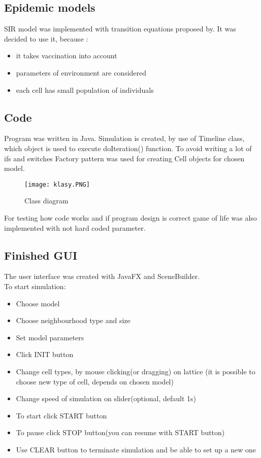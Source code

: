 \documentclass[a4paper, 11pt]{article}
\begin{document}
\subsection{Epidemic models}

SIR model was implemented with transition equations proposed by\cite{WHITE}. It was decided to use it, because :\\
\begin{itemize}
\item it takes vaccination into account
\item parameters of environment are considered
\item each cell has small population of individuals
\end{itemize}



\subsection{Code}
Program was written in Java. Simulation is created, by use of Timeline class, which object is used to execute doIteration() function. To avoid writing a lot of ifs and switches Factory pattern was used for creating Cell objects for chosen model.
\begin{figure}[H]
\texttt{[image: klasy.PNG]} 
\caption{Class diagram}
\end{figure}



For testing how code works and if program design is correct game of life was also implemented with not hard coded parameter.


\subsection{Finished GUI}
The user interface was created with JavaFX and SceneBuilder.\\
To start simulation:
\begin{itemize}
\item Choose model
\item Choose neighbourhood type and size
\item Set model parameters
\item Click INIT button
\item Change cell types, by mouse clicking(or dragging) on lattice (it is possible to choose new type of cell, depends on chosen model)
\item Change speed of simulation on slider(optional, default 1s)
\item To start click START button
\item To pause click STOP button(you can resume with START button)
\item Use CLEAR button to terminate simulation and be able to set up a new one

\end{itemize}
\end{document}
